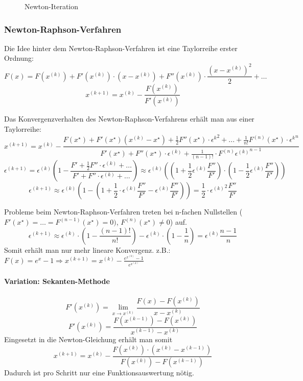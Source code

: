 \begin{figure}[htdp]
	\center
	
	\caption{Newton-Iteration}
\end{figure}

\subsubsection{Newton-Raphson-Verfahren} Die Idee hinter dem Newton-Raphson-Verfahren ist eine Taylorreihe erster Ordnung:
\[F(x) = F(x^{(k)}) + F'(x^{(k)}) \cdot (x - x^{(k)}) + F''(x^{(k)}) \cdot \frac{(x - x^{(k)})^2}{2} + \dots\]
\[x^{(k + 1)} = x^{(k)} - \frac{F(x^{(k)})}{F'(x^{(k)})}\]

Das Konvergenzverhalten des Newton-Raphson-Verfahrens erhält man aus einer Taylorreihe:
\[x^{(k + 1)} = x^{(k)} - \frac{F(x^\star) + F'(x^\star)(x^{(k)} - x^\star) + \frac{1}{2} F''(x^\star) \cdot {\epsilon^{k}}^2 + ... + \frac{1}{n!} F^{(n)}(x^\star) \cdot {\epsilon^{k}}^n}{F'(x^\star) + F''(x^\star) \cdot \epsilon^{(k)} + \frac{1}{(n - 1)!} \cdot F^{(n)} {\epsilon^{(k)}}^{n - 1}}\]
\[\epsilon^{(k + 1)} = \epsilon^{(k)} \left( 1 - \frac{F' + \frac{1}{2} F'' \cdot \epsilon^{(k)} + \dots}{F' + F'' \cdot \epsilon^{(k)} + \dots} \right) \approx \epsilon^{(k)} \left( \left(1 + \frac{1}{2} \epsilon^{(k)} \frac{F''}{F'} \right) \cdot \left( 1 - \frac{1}{2} \epsilon^{(k)} \frac{F''}{F'} \right) \right)\]
\[\epsilon^{(k + 1)} \approx \epsilon^{(k)} \left( 1 - \left( 1 + \frac{1}{2} \cdot \epsilon^{(k)} \frac{F''}{F'} - \epsilon^{(k)} \frac{F''}{F'}\right)\right) = \frac{1}{2} \cdot {\epsilon^{(k)}}^2 \frac{F''}{F'}\]

Probleme beim Newton-Raphson-Verfahren treten bei n-fachen Nullstellen ($F'(x^\star) = \dots = F^{(n - 1)}(x^\star) = 0)$, $F^{(n)}(x^\star) \ne 0$) auf.
\[\epsilon^{(k + 1)} \approx \epsilon^{(k)} \cdot \left( 1 - \frac{(n - 1)!}{n!}\right) - \epsilon^{(k)} \cdot \left( 1 - \frac{1}{n}\right) = \epsilon^{(k)} \frac{n - 1}{n}\]
Somit erhält man nur mehr lineare Konvergenz.
z.B.: $F(x) = e^x - 1 \Rightarrow x^{(k + 1)} = x^{(k)} - \frac{e^{x^{(k)}} - 1}{e^{x^{(k)}}}$

\paragraph{Variation: Sekanten-Methode}
\[F'(x^{(k)}) = \lim_{x \rightarrow x^{(k)}} \frac{F(x) - F(x^{(k)})}{x - x^{(k)}}\]
\[F'(x^{(k)}) = \frac{F(x^{(k - 1)}) - F(x^{(k)})}{x^{(k - 1)} - x^{(k)}}\]
Eingesetzt in die Newton-Gleichung erhält man somit
\[x^{(k + 1)} = x^{(k)} - \frac{F(x^{(k)}) \cdot (x^{(k)} - x^{(k - 1)})}{F(x^{(k)}) - F(x^{(k - 1)})}\]
Dadurch ist pro Schritt nur eine Funktionsauswertung nötig.


